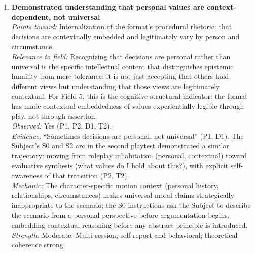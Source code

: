 \begin{enumerate}
\textit{Mechanic:} The three-value motion structure assigns each team a value that is genuinely defensible for the character; the Subject's final synthesis requirement frames the question as ``what matters most to this person in this context'' rather than ``which position is objectively correct,'' making all three perspectives legitimate from the outset. The S0 speech institutionalises bias transparency rather than suppressing it, which makes epistemic humility structurally available rather than personally effortful.\\
\textit{Strength:} Moderate. Multi-session; self-report; directly on-target with design intent; P1 formulation notable for being unprompted; P2 debrief conversation particularly theoretically rich.

\item \textbf{Demonstrated understanding that personal values are context-dependent, not universal}\\
\textit{Points toward:} Internalization of the format's procedural rhetoric: that decisions are contextually embedded and legitimately vary by person and circumstance.\\
\textit{Relevance to field:} Recognizing that decisions are personal rather than universal is the specific intellectual content that distinguishes epistemic humility from mere tolerance: it is not just accepting that others hold different views but understanding that those views are legitimately contextual. For Field 5, this is the cognitive-structural indicator: the format has made contextual embeddedness of values experientially legible through play, not through assertion.\\
\textit{Observed:} Yes (P1, P2, D1, T2).\\
\textit{Evidence:} ``Sometimes decisions are personal, not universal'' (P1, D1). The Subject's S0 and S2 arc in the second playtest demonstrated a similar trajectory: moving from roleplay inhabitation (personal, contextual) toward evaluative synthesis (what values do I hold about this?), with explicit self-awareness of that transition (P2, T2).\\
\textit{Mechanic:} The character-specific motion context (personal history, relationships, circumstances) makes universal moral claims strategically inappropriate to the scenario; the S0 instructions ask the Subject to describe the scenario from a personal perspective before argumentation begins, embedding contextual reasoning before any abstract principle is introduced.\\
\textit{Strength:} Moderate. Multi-session; self-report and behavioral; theoretical coherence strong.


\end{enumerate}
